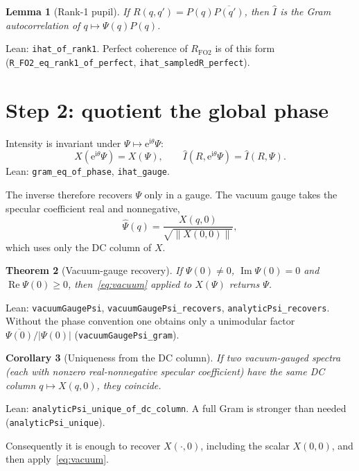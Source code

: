 \documentclass[11pt,a4paper]{article}
\newtheorem{theorem}{Theorem}[section]
\newtheorem{lemma}[theorem]{Lemma}
\newtheorem{corollary}[theorem]{Corollary}
\theoremstyle{definition}
\theoremstyle{remark}
\newcommand{\ee}{\mathrm{e}}
\newcommand{\ii}{\mathrm{i}}
\newcommand{\conj}[1]{\overline{#1}}
\newcommand{\abs}[1]{\lvert#1\rvert}
\newcommand{\norm}[1]{\lVert#1\rVert}
\newcommand{\RFOII}{R_{\mathrm{FO2}}}
\begin{document}
\begin{lemma}[Rank-1 pupil]
\label{lem:rank1}
If $R(q,q')=P(q)\conj{P(q')}$, then $\hat I$ is the Gram
autocorrelation of $q\mapsto\Psi(q)P(q)$.
\end{lemma}
Lean: \texttt{ihat\_of\_rank1}.
Perfect coherence of $\RFOII$ is of this form
(\texttt{R\_FO2\_eq\_rank1\_of\_perfect},
\texttt{ihat\_sampledR\_perfect}).

\section{Step 2: quotient the global phase}
\label{sec:gauge}

Intensity is invariant under $\Psi\mapsto\ee^{\ii\theta}\Psi$:
\begin{equation}
\label{eq:gauge}
X(\ee^{\ii\theta}\Psi)=X(\Psi),
\qquad
\hat I(R,\ee^{\ii\theta}\Psi)=\hat I(R,\Psi).
\end{equation}
Lean: \texttt{gram\_eq\_of\_phase}, \texttt{ihat\_gauge}.

The inverse therefore recovers $\Psi$ only in a gauge.
The vacuum gauge takes the specular coefficient real and nonnegative,
\begin{equation}
\label{eq:vacuum}
\hat\Psi(q)
=\frac{X(q,0)}{\sqrt{\norm{X(0,0)}}},
\end{equation}
which uses only the DC column of $X$.

\begin{theorem}[Vacuum-gauge recovery]
\label{thm:vacuum}
If $\Psi(0)\neq 0$, $\operatorname{Im}\Psi(0)=0$ and
$\operatorname{Re}\Psi(0)\ge 0$, then~\eqref{eq:vacuum} applied to
$X(\Psi)$ returns $\Psi$.
\end{theorem}
Lean: \texttt{vacuumGaugePsi}, \texttt{vacuumGaugePsi\_recovers},
\texttt{analyticPsi\_recovers}.
Without the phase convention one obtains only a unimodular factor
$\conj{\Psi(0)}/\abs{\Psi(0)}$
(\texttt{vacuumGaugePsi\_gram}).

\begin{corollary}[Uniqueness from the DC column]
\label{cor:dccol}
If two vacuum-gauged spectra (each with nonzero real-nonnegative
specular coefficient) have the same DC column
$q\mapsto X(q,0)$, they coincide.
\end{corollary}
Lean: \texttt{analyticPsi\_unique\_of\_dc\_column}.
A full Gram is stronger than needed
(\texttt{analyticPsi\_unique}).

Consequently it is enough to recover $X(\cdot,0)$, including the
scalar $X(0,0)$, and then apply~\eqref{eq:vacuum}.
\end{document}
